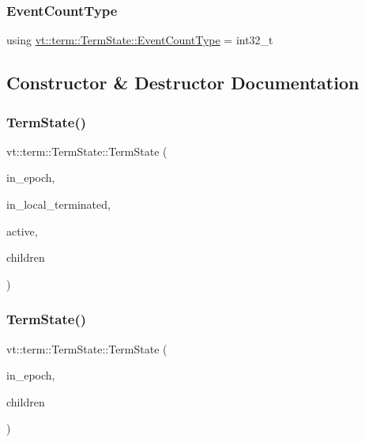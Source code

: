\subsubsection{\texorpdfstring{Event\+Count\+Type}{EventCountType}}
{\footnotesize\ttfamily using \hyperlink{structvt_1_1term_1_1_term_state_a900fe4e9d98c81a320ae1dca27b71c2c}{vt\+::term\+::\+Term\+State\+::\+Event\+Count\+Type} =  int32\+\_\+t}



\subsection{Constructor \& Destructor Documentation}
\mbox{\label{structvt_1_1term_1_1_term_state_a6949c80d5206b322eb0034ad17aa0ad0}} 
\subsubsection{\texorpdfstring{Term\+State()}{TermState()}\hspace{0.1cm}{\footnotesize\ttfamily [1/4]}}
{\footnotesize\ttfamily vt\+::term\+::\+Term\+State\+::\+Term\+State (\begin{DoxyParamCaption}\item[{\hyperlink{namespacevt_a81d11b28122d43bf9834577e4a06440f}{Epoch\+Type} const \&}]{in\+\_\+epoch,  }\item[{bool const}]{in\+\_\+local\+\_\+terminated,  }\item[{bool const}]{active,  }\item[{\hyperlink{namespacevt_a866da9d0efc19c0a1ce79e9e492f47e2}{Node\+Type} const \&}]{children }\end{DoxyParamCaption})}

\mbox{\label{structvt_1_1term_1_1_term_state_a07b3f0ad915aee5a30d526e6172f3f90}} 
\subsubsection{\texorpdfstring{Term\+State()}{TermState()}\hspace{0.1cm}{\footnotesize\ttfamily [2/4]}}
{\footnotesize\ttfamily vt\+::term\+::\+Term\+State\+::\+Term\+State (\begin{DoxyParamCaption}\item[{\hyperlink{namespacevt_a81d11b28122d43bf9834577e4a06440f}{Epoch\+Type} const \&}]{in\+\_\+epoch,  }\item[{\hyperlink{namespacevt_a866da9d0efc19c0a1ce79e9e492f47e2}{Node\+Type} const \&}]{children }\end{DoxyParamCaption})}


